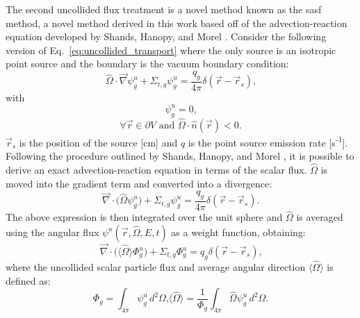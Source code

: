 The second uncollided flux treatment is a novel method known as the \acrfull{sasf} method, a novel method derived in this work based off of the advection-reaction equation developed by Shands, Hanopy, and Morel \cite{modified_sn}. Consider the following version of Eq.~\ref{eq:uncollided_transport} where the only source is an isotropic point source and the boundary is the vacuum boundary condition:
\begin{equation}\label{eq:iso_src}
    \hat{\Omega}\cdot\vec{\nabla}\psi^{u}_{g}
    + \Sigma_{t,g}\psi^{u}_{g}
    = \frac{q_{g}}{4\pi}\delta(\vec{r} - \vec{r}_{s})\text{,}
\end{equation}
with
\begin{equation}\label{eq:uncollided_transport_bc_void}
    \psi^{u}_{g} = 0\text{,}
\end{equation}
\begin{equation*}
    \forall \vec{r}\in\partial V \text{ and } \hat{\Omega}\cdot\hat{n}(\vec{r}) < 0\text{.}
\end{equation*}
$\vec{r}_{s}$ is the position of the source [cm] and $q$ is the point source emission rate [s\textsuperscript{-1}]. Following the procedure outlined by Shands, Hanopy, and Morel \cite{modified_sn}, it is possible to derive an exact advection-reaction equation in terms of the scalar flux. $\hat{\Omega}$ is moved into the gradient term and converted into a divergence:
\begin{equation*}
    \vec{\nabla}\cdot\Big(\hat{\Omega}\psi^{u}_{g}\Big)
    + \Sigma_{t,g}\psi^{u}_{g}
    = \frac{q_{g}}{4\pi}\delta(\vec{r} - \vec{r}_{s})\text{.}
\end{equation*}
The above expression is then integrated over the unit sphere and $\hat{\Omega}$ is averaged using the angular flux $\psi^{u}(\vec{r}, \hat{\Omega}, E, t)$ as a weight function, obtaining:
\begin{equation}\label{eq:sasf_div}
    \vec{\nabla}\cdot\Big(\langle\hat{\Omega}\rangle\Phi^{u}_{g}\Big)
    + \Sigma_{t,g}\Phi^{u}_{g}
    = q_{g}\delta(\vec{r} - \vec{r}_{s})\text{,}
\end{equation}
where the uncollided scalar particle flux and average angular direction $\langle\hat{\Omega}\rangle$ is defined as:
\begin{subequations}
    \begin{equation}\label{eq:scalar_flux_sasf}
        \Phi_{g} = \int_{4\pi} \psi^{u}_{g}\,d^{2}\Omega\text{,}
    \end{equation}
    \begin{equation}\label{eq:avg_dir}
        \langle\hat{\Omega}\rangle = \frac{1}{\Phi_{g}}\int_{4\pi}\hat{\Omega}\psi^{u}_{g}\,d^{2}\Omega\text{.}
    \end{equation}
\end{subequations}
